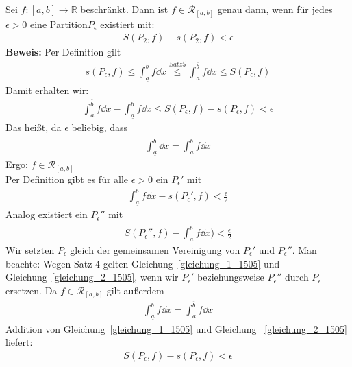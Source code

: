 \begin{Satz}{
	Sei $f: [a,b] \rightarrow \mathbb{R}$ beschränkt. Dann ist 
	$f \in \mathcal{R}_{[a,b]}$ genau dann, wenn für jedes $\epsilon > 0$ eine 
	Partition$P_{\epsilon}$ existiert mit:
	\begin{align*}
		S(P_2,f) - s(P_2,f) < \epsilon
	\end{align*}
	\textbf{Beweis:} Per Definition gilt 
	\begin{align*}
		s(P_{\epsilon},f) \leq \int_{\underline{a}}^b f \dd{x}
		\overset{Satz 5}{\le} \int_a^{\overline{b}} f \dd{x} 
		\leq S(P_{\epsilon},f) 		
	\end{align*}
	Damit erhalten wir:
	\begin{align*}
		\int_a^{\overline{b}} f \dd{x} - 
		\int_{\underline{a}}^b f \dd{x} \leq S(P_{\epsilon},f) 
		- s(P_{\epsilon},f) < \epsilon
	\end{align*}
	Das heißt, da $\epsilon$ beliebig, dass
	\begin{align*}
		\int_{\underline{a}}^b \dd{x} = \int_a^{\overline{b}} f \dd{x}
	\end{align*}
	Ergo: $f \in \mathcal{R}_{[a,b]}$ \\
	Per Definition gibt es für alle $\epsilon > 0$ ein $P_{\epsilon}'$ mit 
	\begin{align}
		\label{gleichung_1_1505}
		\int_{\underline{a}}^b f \dd{x} - s(P_{\epsilon}',f) < \frac{\epsilon}{2} 
	\end{align}
	Analog existiert ein $P_{\epsilon}''$ mit 
	\begin{align}
		\label{gleichung_2_1505}
		S(P_{\epsilon}'',f) - \int_a^{\overline{b}} f \dd{x}) < \frac{\epsilon}{2}
	\end{align}
	Wir setzten $P_{\epsilon}$ gleich der gemeinsamen Vereinigung von 
	$P_{\epsilon}'$ und $P_{\epsilon}''$. Man beachte: Wegen Satz 4 %
	gelten Gleichung~\ref{gleichung_1_1505} und Gleichung~\ref{gleichung_2_1505},
	wenn wir $P_{\epsilon}'$ beziehungsweise $P_{\epsilon}''$ durch $P_{\epsilon}$
	ersetzen. Da $f \in \mathcal{R}_{[a,b]}$ gilt außerdem 
	\begin{align*}
		\int_{\underline{a}}^b f \dd{x} = \int_a^{\overline{b}} f\dd{x}
	\end{align*}	 
	Addition von Gleichung~\ref{gleichung_1_1505} und Gleichung~
	\ref{gleichung_2_1505} liefert:
	\begin{align*}
	S(P_{\epsilon},f) - s(P_{\epsilon},f) < \epsilon
	\end{align*}
}\end{Satz}

